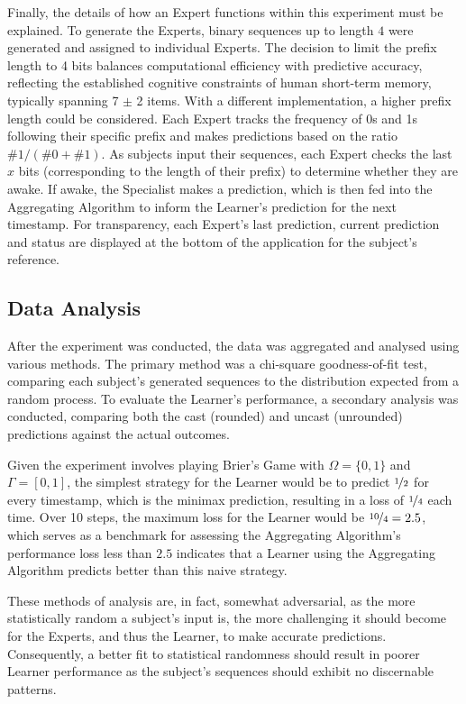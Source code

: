 Finally, the details of how an Expert functions within this experiment must be explained. To generate the Experts, binary sequences up to length $4$ were generated and assigned to individual Experts. The decision to limit the prefix length to 4 bits balances computational efficiency with predictive accuracy, reflecting the established cognitive constraints of human short-term memory, typically spanning 7 $\pm$ 2 items. With a different implementation, a higher prefix length could be considered. Each Expert tracks the frequency of 0s and 1s following their specific prefix and makes predictions based on the ratio $\#1 / (\#0 + \#1)$. As subjects input their sequences, each Expert checks the last $x$ bits (corresponding to the length of their prefix) to determine whether they are awake. If awake, the Specialist makes a prediction, which is then fed into the Aggregating Algorithm to inform the Learner's prediction for the next timestamp. For transparency, each Expert's last prediction, current prediction and status are displayed at the bottom of the application for the subject's reference.

\subsection{Data Analysis}\label{subsection:data_analysis}
After the experiment was conducted, the data was aggregated and analysed using various methods. The primary method was a chi-square goodness-of-fit test, comparing each subject's generated sequences to the distribution expected from a random process. To evaluate the Learner's performance, a secondary analysis was conducted, comparing both the cast (rounded) and uncast (unrounded) predictions against the actual outcomes.

Given the experiment involves playing Brier's Game with $\Omega = \{0, 1\}$ and $\Gamma = [0, 1]$, the simplest strategy for the Learner would be to predict $\nicefrac{1}{2}$ for every timestamp, which is the minimax prediction, resulting in a loss of $\nicefrac{1}{4}$ each time. Over 10 steps, the maximum loss for the Learner would be $\nicefrac{10}{4} = 2.5$, which serves as a benchmark for assessing the Aggregating Algorithm's performance \textendash{} loss less than $2.5$ indicates that a Learner using the Aggregating Algorithm predicts better than this naive strategy.

These methods of analysis are, in fact, somewhat adversarial, as the more statistically random a subject's input is, the more challenging it should become for the Experts, and thus the Learner, to make accurate predictions. Consequently, a better fit to statistical randomness should result in poorer Learner performance as the subject's sequences should exhibit no discernable patterns.
\newpage

